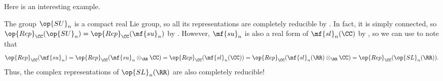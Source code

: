 \documentclass[../notes.tex]{subfiles}
\begin{document}
Here is an interesting example.
\begin{example} \label{ex:sl-reduces}
	The group $\op{SU}_n$ is a compact real Lie group, so all its representations are completely reducible by . In fact, it is simply connected, so $\op{Rep}_\CC({\op{SU}_n})=\op{Rep}_\CC(\mf{su}_n)$ by . However, $\mf{su}_n$ is also a real form of $\mf{sl}_n(\CC)$ by , so we can use  to note that
	\[\op{Rep}_\CC(\mf{su}_n)=\op{Rep}_\CC(\mf{su}_n\otimes_\RR\CC)=\op{Rep}_\CC(\mf{sl}_n(\CC))=\op{Rep}_\CC(\mf{sl}_n(\RR)\otimes_\RR\CC)=\op{Rep}_\CC({\op{SL}_n(\RR)}).\]
	Thus, the complex representations of $\op{SL}_n(\RR)$ are also completely reducible!
\end{example}
\end{document}
